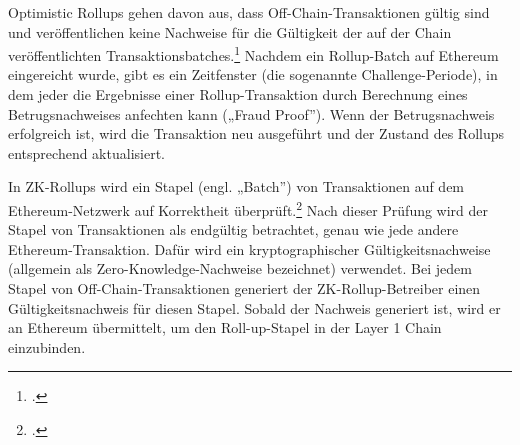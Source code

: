 \begin{itemize}
    \noindent
    Optimistic Rollups gehen davon aus, dass Off-Chain-Transaktionen gültig sind und veröffentlichen keine Nachweise für die Gültigkeit der auf der Chain veröffentlichten Transaktionsbatches.\footcite[Vgl. hierzu und zum Folgenden sowie weiterführend][]{w22}
    Nachdem ein Rollup-Batch auf Ethereum eingereicht wurde, gibt es ein Zeitfenster (die sogenannte Challenge-Periode), in dem jeder die Ergebnisse einer Rollup-Transaktion durch Berechnung eines Betrugsnachweises anfechten kann („Fraud Proof”).
    Wenn der Betrugsnachweis erfolgreich ist, wird die Transaktion neu ausgeführt und der Zustand des Rollups entsprechend aktualisiert.

    \noindent
    In ZK-Rollups wird ein Stapel (engl. „Batch”) von Transaktionen auf dem Ethereum-Netzwerk auf Korrektheit überprüft.\footcite[Vgl. hierzu und zum Folgenden sowie weiterführend][]{w23}
    Nach dieser Prüfung wird der Stapel von Transaktionen als endgültig betrachtet, genau wie jede andere Ethereum-Transaktion. Dafür wird ein kryptographischer Gültigkeitsnachweise (allgemein als Zero-Knowledge-Nachweise bezeichnet) verwendet. 
    Bei jedem Stapel von Off-Chain-Transaktionen generiert der ZK-Rollup-Betreiber einen Gültigkeitsnachweis für diesen Stapel. Sobald der Nachweis generiert ist, wird er an Ethereum übermittelt, um den Roll-up-Stapel in der Layer 1 Chain einzubinden.
\end{itemize}